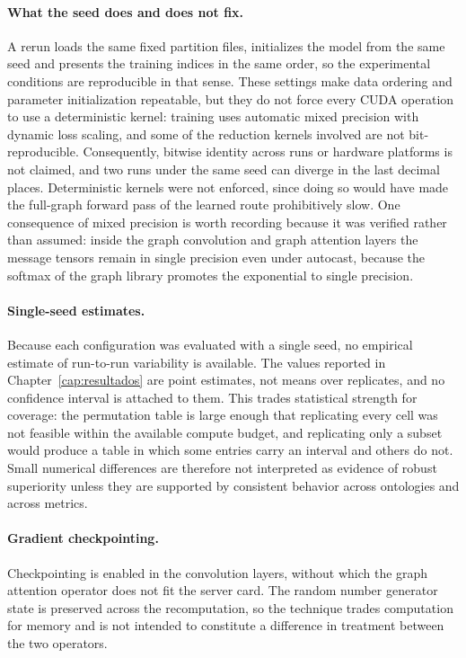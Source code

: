 \documentclass[Ingles]{ic-tese-v3}
\begin{document}
\begin{appendices}{}
\paragraph{What the seed does and does not fix.} A rerun loads the same fixed partition files,
initializes the model from the same seed and presents the training indices in the same order, so the
experimental conditions are reproducible in that sense. These settings make data ordering and
parameter initialization repeatable, but they do not force every CUDA operation to use a
deterministic kernel: training uses automatic mixed precision with dynamic loss scaling, and some of
the reduction kernels involved are not bit-reproducible. Consequently, bitwise identity across runs
or hardware platforms is not claimed, and two runs under the same seed can diverge in the last
decimal places. Deterministic kernels were not enforced, since doing so would have made the
full-graph forward pass of the learned route prohibitively slow. One consequence of mixed precision
is worth recording because it was verified rather than assumed: inside the graph convolution and
graph attention layers the message tensors remain in single precision even under autocast, because
the softmax of the graph library promotes the exponential to single precision.

\paragraph{Single-seed estimates.} Because each configuration was evaluated with a single seed, no
empirical estimate of run-to-run variability is available. The values reported in
Chapter~\ref{cap:resultados} are point estimates, not means over replicates, and no confidence
interval is attached to them. This trades statistical strength for coverage: the permutation table is
large enough that replicating every cell was not feasible within the available compute budget, and
replicating only a subset would produce a table in which some entries carry an interval and others do
not. Small numerical differences are therefore not interpreted as evidence of robust superiority
unless they are supported by consistent behavior across ontologies and across metrics.

\paragraph{Gradient checkpointing.} Checkpointing is enabled in the convolution layers, without which
the graph attention operator does not fit the server card. The random number generator state is
preserved across the recomputation, so the technique trades computation for memory and is not
intended to constitute a difference in treatment between the two operators.


\end{appendices}
\end{document}
